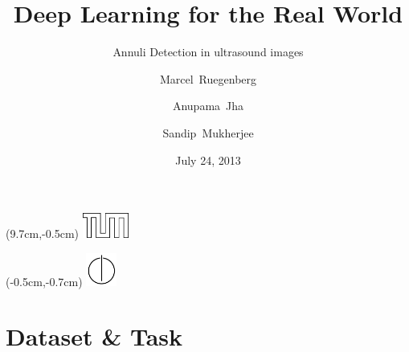 \documentclass[14pt,mathserif]{beamer}
\title{\huge \textbf{Deep Learning for the Real World}}
\subtitle{Annuli Detection in ultrasound images}
\author{Marcel~Ruegenberg \and Anupama~Jha \and Sandip~Mukherjee}
\date{July 24, 2013}
\begin{document}
%

\begin{frame}
\maketitle
\begin{textblock*}{1.731cm}(9.7cm,-0.5cm)
  \includegraphics[width=1.53cm]{tumlogo2.png}
\end{textblock*}
\begin{textblock*}{2cm}(-0.5cm,-0.7cm)
  \includegraphics[width=1cm]{inlogo.png}
\end{textblock*}

\end{frame}




\AtBeginSection{
\begin{frame}
\begin{center}
\structure{\LARGE \textbf{\insertsection}}
\end{center}
\end{frame}
}



\section{Dataset \& Task}
\end{document}
